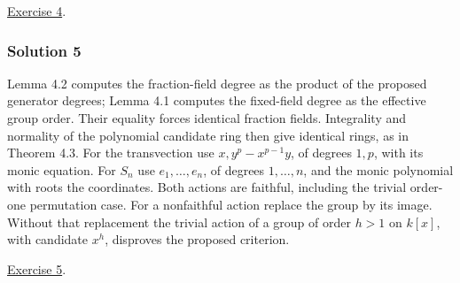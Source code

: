\documentclass[
]{article}
\begin{document}
\hyperref[exercise-4]{Exercise 4}.

\subsubsection{Solution 5}\label{solution-5}

Lemma 4.2 computes the fraction-field degree as the product of the
proposed generator degrees; Lemma 4.1 computes the fixed-field degree as
the effective group order. Their equality forces identical fraction
fields. Integrality and normality of the polynomial candidate ring then
give identical rings, as in Theorem 4.3. For the transvection use
\(x,y^p-x^{p-1}y\), of degrees \(1,p\), with its monic equation. For
\(S_n\) use \(e_1,\ldots,e_n\), of degrees \(1,\ldots,n\), and the monic
polynomial with roots the coordinates. Both actions are faithful,
including the trivial order-one permutation case. For a nonfaithful
action replace the group by its image. Without that replacement the
trivial action of a group of order \(h>1\) on \(k [x]\), with candidate
\(x^h\), disproves the proposed criterion.

\hyperref[exercise-5]{Exercise 5}.
\end{document}
